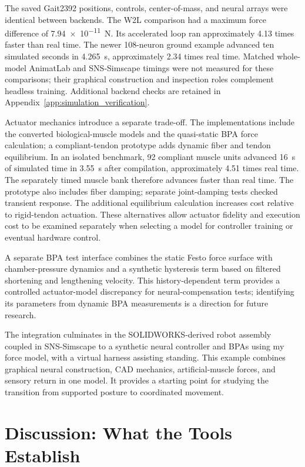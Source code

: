 The saved Gait2392 positions, controls, center-of-mass, and neural arrays were identical between backends. The W2L comparison had a maximum force difference of \qty{7.94e-11}{\newton}. Its accelerated loop ran approximately 4.13 times faster than real time. The newer 108-neuron ground example advanced ten simulated seconds in \qty{4.265}{\second}, approximately 2.34 times real time. Matched whole-model AnimatLab and SNS-Simscape timings were not measured for these comparisons; their graphical construction and inspection roles complement headless training. Additional backend checks are retained in Appendix~\ref{app:simulation_verification}.

Actuator mechanics introduce a separate trade-off. The implementations include the converted biological-muscle models and the quasi-static BPA force calculation; a compliant-tendon prototype adds dynamic fiber and tendon equilibrium. In an isolated benchmark, 92 compliant muscle units advanced \qty{16}{\second} of simulated time in \qty{3.55}{\second} after compilation, approximately 4.51 times real time. The separately timed muscle bank therefore advances faster than real time. The prototype also includes fiber damping; separate joint-damping tests checked transient response. The additional equilibrium calculation increases cost relative to rigid-tendon actuation. These alternatives allow actuator fidelity and execution cost to be examined separately when selecting a model for controller training or eventual hardware control.

A separate BPA test interface combines the static Festo force surface with chamber-pressure dynamics and a synthetic hysteresis term based on filtered shortening and lengthening velocity. This history-dependent term provides a controlled actuator-model discrepancy for neural-compensation tests; identifying its parameters from dynamic BPA measurements is a direction for future research.

The integration culminates in the SOLIDWORKS-derived robot assembly coupled in SNS-Simscape to a synthetic neural controller and BPAs using my force model, with a virtual harness assisting standing. This example combines graphical neural construction, CAD mechanics, artificial-muscle forces, and sensory return in one model. It provides a starting point for studying the transition from supported posture to coordinated movement.

\section{Discussion: What the Tools Establish}\label{sec:sns_discussion}

